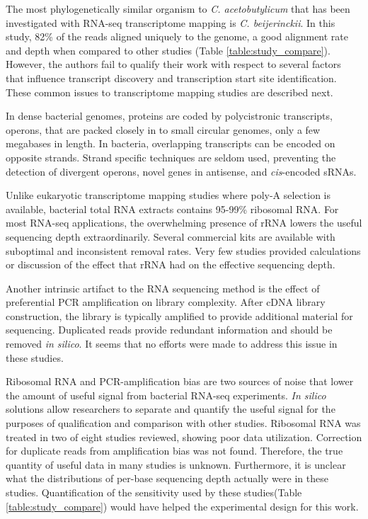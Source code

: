 The most phylogenetically similar organism to \textit{C. acetobutylicum} that has been investigated with RNA-seq transcriptome mapping is \textit{C. beijerinckii}.\cite{114} In this study, 82\% of the reads aligned uniquely to the genome, a good alignment rate and depth when compared to other studies (Table \ref{table:study_compare}). However, the authors fail to qualify their work with respect to several factors that influence transcript discovery and transcription start site identification. These common issues to transcriptome mapping studies are described next.

In dense bacterial genomes, proteins are coded by polycistronic transcripts, operons, that are packed closely in to small circular genomes, only a few megabases in length. In bacteria, overlapping transcripts can be encoded on opposite strands. Strand specific techniques are seldom used,\cite{115} preventing the detection of divergent operons, novel genes in antisense, and \textit{cis}-encoded sRNAs.

Unlike eukaryotic transcriptome mapping studies where poly-A selection is available, bacterial total RNA extracts contains 95-99\% ribosomal RNA.\cite{116,117,118} For most RNA-seq applications, the overwhelming presence of rRNA lowers the useful sequencing depth extraordinarily. Several commercial kits are available with suboptimal and inconsistent removal rates.\cite{115,116,117} Very few studies provided calculations or discussion of the effect that rRNA had on the effective sequencing depth.

Another intrinsic artifact to the RNA sequencing method is the effect of preferential PCR amplification on library complexity.\cite{174,175} After cDNA library construction, the library is typically amplified to provide additional material for sequencing. Duplicated reads provide redundant information and should be removed \textit{in silico}.\cite{40} It seems that no efforts were made to address this issue in these studies.  

Ribosomal RNA and PCR-amplification bias are two sources of noise that lower the amount of useful signal from bacterial RNA-seq experiments. \textit{In silico} solutions\cite{40,17} allow researchers to separate and quantify the useful signal for the purposes of qualification and comparison with other studies. Ribosomal RNA was treated in two of eight studies reviewed, showing poor data utilization.\cite{119,170} Correction for duplicate reads from amplification bias was not found. Therefore, the true quantity of useful data in many studies is unknown. Furthermore, it is unclear what the distributions of per-base sequencing depth actually were in these studies. Quantification of the sensitivity used by these studies(Table \ref{table:study_compare}) would have helped the experimental design for this work.

